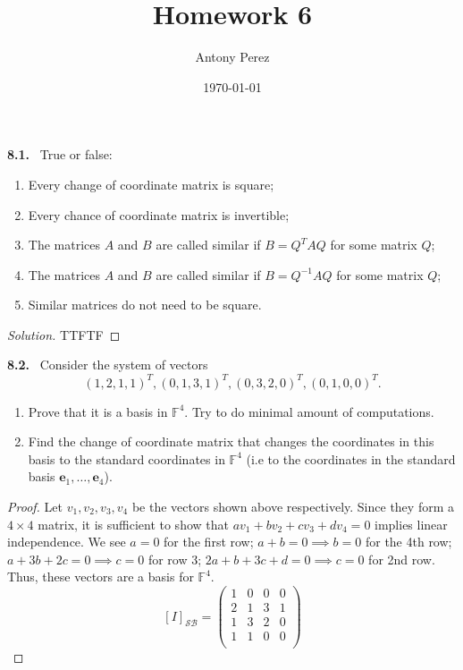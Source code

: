 \documentclass[12pt]{amsart}
\title{Homework 6}
\author{Antony Perez}
\date{\today}
\newcommand{\F}{\mathbb{F}}
\theoremstyle{plain}
\theoremstyle{definition}
\theoremstyle{remark}
\newenvironment{problem}[1]{\par\medskip\noindent\textbf{#1.}\ }{\par\smallskip}
\newenvironment{solution}{\begin{proof}[Solution]}{\end{proof}}
\begin{document}
\maketitle
\begin{problem}{8.1}
    True or false:
    \begin{enumerate}
        \item[a)] Every change of coordinate matrix is square;
        \item[b)] Every chance of coordinate matrix is invertible;
        \item[c)] The matrices $A$ and $B$ are called similar if $B = Q^T AQ$ for some matrix $Q$;
        \item[d)] The matrices $A$ and $B$ are called similar if $B = Q^{-1}AQ$ for some matrix $Q$;
        \item[e)] Similar matrices do not need to be square.    
    \end{enumerate}
\end{problem}

\begin{solution}
    TTFTF
\end{solution}

\begin{problem}{8.2}
    Consider the system of vectors
    \[(1,2,1,1)^T, (0,1,3,1)^T, (0,3,2,0)^T, (0,1,0,0)^T.\]
    \begin{enumerate}
        \item[a)] Prove that it is a basis in $\F^4$. Try to do minimal amount of computations.
        \item[b)] Find the change of coordinate matrix that changes the coordinates in this basis to the standard coordinates in $\F^4$ (i.e to the coordinates in the standard basis $\mathbf{e}_1,\ldots,\mathbf{e}_4$). 
    \end{enumerate}
\end{problem}

\begin{proof}
    Let $v_1,v_2,v_3,v_4$ be the vectors shown above respectively. Since they form a $4\times 4$ matrix, it is sufficient to show that $av_1+bv_2+cv_3+dv_4 = 0$ implies linear independence. We see $a=0$ for the first row; $a+b = 0 \implies b = 0$ for the 4th row; $a + 3b + 2c = 0 \implies c =0$ for row 3; $2a + b + 3c + d =0 \implies c = 0$ for 2nd row. Thus, these vectors are a basis for $\F^4$. 
    \[[I]_{\mathcal{S}\mathcal{B}} = \begin{pmatrix}
        1 & 0 & 0 & 0 \\ 
        2 & 1 & 3 & 1 \\ 
        1 & 3 & 2 & 0 \\
        1 & 1 & 0 & 0 \\ 
    \end{pmatrix}\]
\end{proof}
\end{document}
